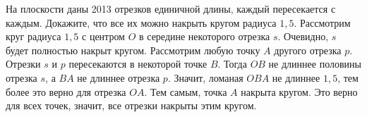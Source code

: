 \problem
На плоскости даны 2013 отрезков единичной длины, каждый пересекается с каждым.
Докажите, что все их можно накрыть кругом радиуса $1{,}5$.
\solution
Рассмотрим круг радиуса $1{,}5$ с центром $O$ в середине некоторого отрезка $s$.
Очевидно, $s$ будет полностью накрыт кругом.
Рассмотрим любую точку $A$ другого отрезка $p$.
Отрезки $s$ и $p$ пересекаются в некоторой точке $B$.
Тогда $OB$ не длиннее половины отрезка $s$, а $BA$ не длиннее отрезка $p$.
Значит, ломаная $OBA$ не длиннее $1{,}5$, тем более это верно для отрезка $OA$.
Тем самым, точка $A$ накрыта кругом.
Это верно для всех точек, значит, все отрезки накрыты этим кругом.
\endproblem
